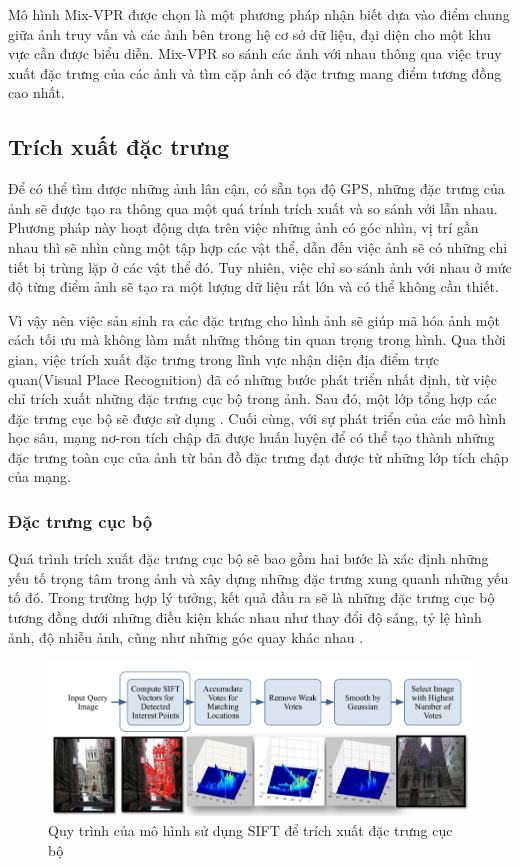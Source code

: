 Mô hình Mix-VPR được chọn là một phương pháp nhận biết dựa vào điểm chung giữa ảnh truy vấn và các ảnh bên trong hệ cơ sở dữ liệu, đại diện cho một khu vực cần được biểu diễn. Mix-VPR so sánh các ảnh với nhau thông qua việc truy xuất đặc trưng của các ảnh và tìm cặp ảnh có đặc trưng mang điểm tương đồng cao nhất.

\subsection{Trích xuất đặc trưng}
Để có thể tìm được những ảnh lân cận, có sẵn tọa độ GPS, những đặc trưng của ảnh sẽ được tạo ra thông qua một quá trính trích xuất và so sánh với lẫn nhau. Phương pháp này hoạt động dựa trên việc những ảnh có góc nhìn, vị trí gần nhau thì sẽ nhìn cùng một tập hợp các vật thể, dẫn đến việc ảnh sẽ có những chi tiết bị trùng lặp ở các vật thể đó. Tuy nhiên, việc chỉ so sánh ảnh với nhau ở mức độ từng điểm ảnh sẽ tạo ra một lượng dữ liệu rất lớn và có thể không cần thiết.

Vì vậy nên việc sản sinh ra các đặc trưng cho hình ảnh sẽ giúp mã hóa ảnh một cách tối ưu mà không làm mất những thông tin quan trọng trong hình. Qua thời gian, việc trích xuất đặc trưng trong lĩnh vực nhận diện địa điểm trực quan(Visual Place Recognition) đã có những bước phát triển nhất định, từ việc chỉ trích xuất những đặc trưng cục bộ trong ảnh. Sau đó, một lớp tổng hợp các đặc trưng cục bộ sẽ được sử dụng \cite{pion2020benchmarking}. Cuối cùng, với sự phát triển của các mô hình học sâu, mạng nơ-ron tích chập đã được huấn luyện để có thể tạo thành những đặc trưng toàn cục của ảnh từ bản đồ đặc trưng đạt được từ những lớp tích chập của mạng.
\subsubsection*{Đặc trưng cục bộ}
Quá trình trích xuất đặc trưng cục bộ sẽ bao gồm hai bước là xác định những yếu tố trọng tâm trong ảnh và xây dựng những đặc trưng xung quanh những yếu tố đó. Trong trường hợp lý tưởng, kết quả đầu ra sẽ là những đặc trưng cục bộ tương đồng dưới những điều kiện khác nhau như thay đổi độ sáng, tỷ lệ hình ảnh, độ nhiễu ảnh, cũng như những góc quay khác nhau \cite{lowe1999object}.

\begin{figure}[H]
    \centering
    \includegraphics[scale=0.5]{pics/Chapter3/SIFT.png}
    \caption{Quy trình của mô hình sử dụng SIFT để trích xuất đặc trưng cục bộ \cite{zamir2010accurate}}
    \label{fig:enter-label}
\end{figure}

